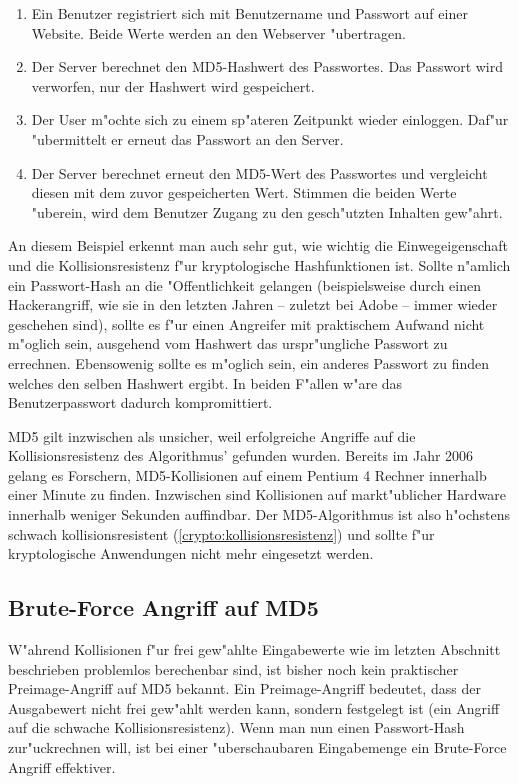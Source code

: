 \begin{refsection}
\begin{enumerate}
		\item Ein Benutzer registriert sich mit Benutzername und Passwort auf einer
			Website. Beide Werte werden an den Webserver "ubertragen.
		\item Der Server berechnet den MD5-Hashwert des Passwortes. Das Passwort wird
			verworfen, nur der Hashwert wird gespeichert.
		\item Der User m"ochte sich zu einem sp"ateren Zeitpunkt wieder einloggen.
			Daf"ur "ubermittelt er erneut das Passwort an den Server.
		\item Der Server berechnet erneut den MD5-Wert des Passwortes und
			vergleicht diesen mit dem zuvor gespeicherten Wert. Stimmen die beiden
			Werte "uberein, wird dem Benutzer Zugang zu den gesch"utzten Inhalten
			gew"ahrt.
\end{enumerate}

An diesem Beispiel erkennt man auch sehr gut, wie wichtig die Einwegeigenschaft
und die Kollisionsresistenz f"ur kryptologische Hashfunktionen ist. Sollte
n"amlich ein Passwort-Hash an die "Offentlichkeit gelangen (beispielsweise durch
einen Hackerangriff, wie sie in den letzten Jahren -- zuletzt bei Adobe -- immer
wieder geschehen sind), sollte es f"ur einen Angreifer mit praktischem Aufwand
nicht m"oglich sein, ausgehend vom Hashwert das urspr"ungliche Passwort zu
errechnen. Ebensowenig sollte es m"oglich sein, ein anderes Passwort zu finden
welches den selben Hashwert ergibt. In beiden F"allen w"are das Benutzerpasswort
dadurch kompromittiert.

MD5 gilt inzwischen als unsicher, weil erfolgreiche Angriffe auf die
Kollisionsresistenz des Algorithmus' gefunden wurden. Bereits im Jahr 2006
gelang es Forschern, MD5-Kollisionen auf einem Pentium 4 Rechner innerhalb einer
Minute zu finden\cite{crypto:stevens2006fast}. Inzwischen sind Kollisionen auf
markt"ublicher Hardware innerhalb weniger Sekunden auffindbar. Der
MD5-Algorithmus ist also h"ochstens schwach kollisionsresistent
(\ref{crypto:kollisionsresistenz}) und sollte f"ur kryptologische Anwendungen
nicht mehr eingesetzt werden.

\subsection{Brute-Force Angriff auf MD5}

W"ahrend Kollisionen f"ur frei gew"ahlte Eingabewerte wie im letzten Abschnitt
beschrieben problemlos berechenbar sind, ist bisher noch kein praktischer
Preimage-Angriff auf MD5 bekannt. Ein Preimage-Angriff bedeutet, dass der
Ausgabewert nicht frei gew"ahlt werden kann, sondern festgelegt ist (ein Angriff
auf die schwache Kollisionsresistenz). Wenn man nun einen Passwort-Hash
zur"uckrechnen will, ist bei einer "uberschaubaren Eingabemenge ein Brute-Force
Angriff effektiver.


\end{refsection}
